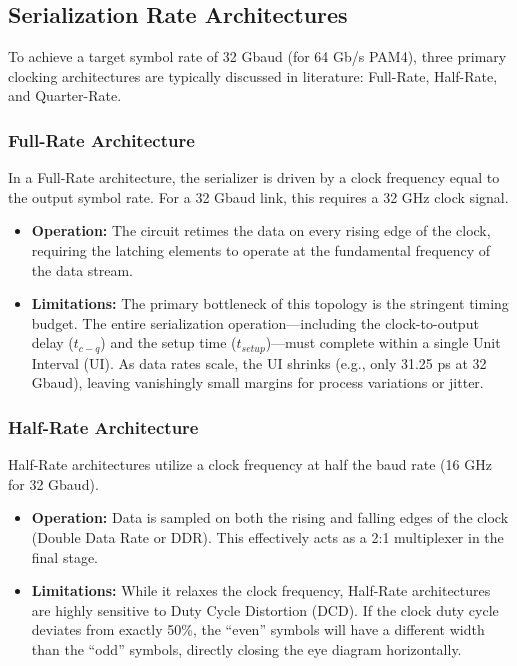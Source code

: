 \subsection{Serialization Rate Architectures}
To achieve a target symbol rate of 32 Gbaud (for 64 Gb/s PAM4), three primary clocking architectures are typically discussed in literature: Full-Rate, Half-Rate, and Quarter-Rate.

\subsubsection{Full-Rate Architecture}
In a Full-Rate architecture, the serializer is driven by a clock frequency equal to the output symbol rate. For a 32 Gbaud link, this requires a 32 GHz clock signal.

\begin{itemize}
    \item \textbf{Operation:} The circuit retimes the data on every rising edge of the clock, requiring the latching elements to operate at the fundamental frequency of the data stream.
    \item \textbf{Limitations:} The primary bottleneck of this topology is the stringent timing budget. The entire serialization operation—including the clock-to-output delay ($t_{c-q}$) and the setup time ($t_{setup}$)—must complete within a single Unit Interval (UI). As data rates scale, the UI shrinks (e.g., only 31.25 ps at 32 Gbaud), leaving vanishingly small margins for process variations or jitter.
\end{itemize}

\subsubsection{Half-Rate Architecture}
Half-Rate architectures utilize a clock frequency at half the baud rate (16 GHz for 32 Gbaud).
\begin{itemize}
    \item \textbf{Operation:} Data is sampled on both the rising and falling edges of the clock (Double Data Rate or DDR). This effectively acts as a 2:1 multiplexer in the final stage.
    \item \textbf{Limitations:} While it relaxes the clock frequency, Half-Rate architectures are highly sensitive to Duty Cycle Distortion (DCD). If the clock duty cycle deviates from exactly 50\%, the ``even'' symbols will have a different width than the ``odd'' symbols, directly closing the eye diagram horizontally.
\end{itemize}


